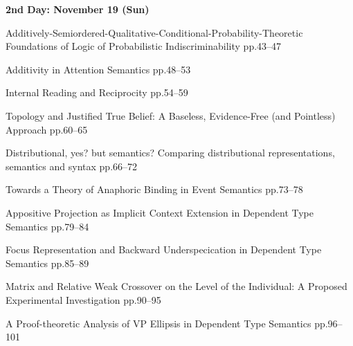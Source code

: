\documentclass[12pt]{jarticle}
\begin{document}
\noindent\textbf{\large 
2nd Day: November 19 (Sun)
}\\







  
     {Additively-Semiordered-Qualitative-Conditional-Probability-Theoretic Foundations of Logic of Probabilistic Indiscriminability}
     {pp.43--47}
  
     {Additivity in Attention Semantics}
     {pp.48--53}
  
     {Internal Reading and Reciprocity}
     {pp.54--59}




  
     {Topology and Justified True Belief: A Baseless, Evidence-Free (and Pointless) Approach}
     {pp.60--65}
  
     {Distributional, yes? but semantics? Comparing distributional representations, semantics and syntax}
     {pp.66--72}
  
     {Towards a Theory of Anaphoric Binding in Event Semantics}
     {pp.73--78}







  
     {Appositive Projection as Implicit Context Extension in Dependent Type Semantics}
     {pp.79--84}
  
     {Focus Representation and Backward Underspecication in Dependent Type Semantics}
     {pp.85--89}
  
     {Matrix and Relative Weak Crossover on the Level of the Individual: A Proposed Experimental Investigation}
     {pp.90--95}







  
     {A Proof-theoretic Analysis of VP Ellipsis in Dependent Type Semantics}
     {pp.96--101}
  
\end{document}
